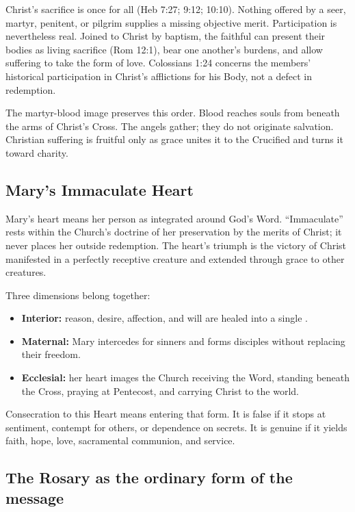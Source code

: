 Christ's sacrifice is once for all (Heb 7:27; 9:12; 10:10). Nothing offered by a seer, martyr, penitent, or pilgrim supplies a missing objective merit. Participation is nevertheless real. Joined to Christ by baptism, the faithful can present their bodies as living sacrifice (Rom 12:1), bear one another's burdens, and allow suffering to take the form of love. Colossians 1:24 concerns the members' historical participation in Christ's afflictions for his Body, not a defect in redemption.

The martyr-blood image preserves this order. Blood reaches souls from beneath the arms of Christ's Cross. The angels gather; they do not originate salvation. Christian suffering is fruitful only as grace unites it to the Crucified and turns it toward charity.

\subsection{Mary's Immaculate Heart}

Mary's heart means her person as integrated around God's Word. “Immaculate” rests within the Church's doctrine of her preservation by the merits of Christ; it never places her outside redemption. The heart's triumph is the victory of Christ manifested in a perfectly receptive creature and extended through grace to other creatures.

Three dimensions belong together:

\begin{itemize}
  \item \textbf{Interior:} reason, desire, affection, and will are healed into a single .
  \item \textbf{Maternal:} Mary intercedes for sinners and forms disciples without replacing their freedom.
  \item \textbf{Ecclesial:} her heart images the Church receiving the Word, standing beneath the Cross, praying at Pentecost, and carrying Christ to the world.
\end{itemize}

Consecration to this Heart means entering that form. It is false if it stops at sentiment, contempt for others, or dependence on secrets. It is genuine if it yields faith, hope, love, sacramental communion, and service.

\subsection{The Rosary as the ordinary form of the message}

